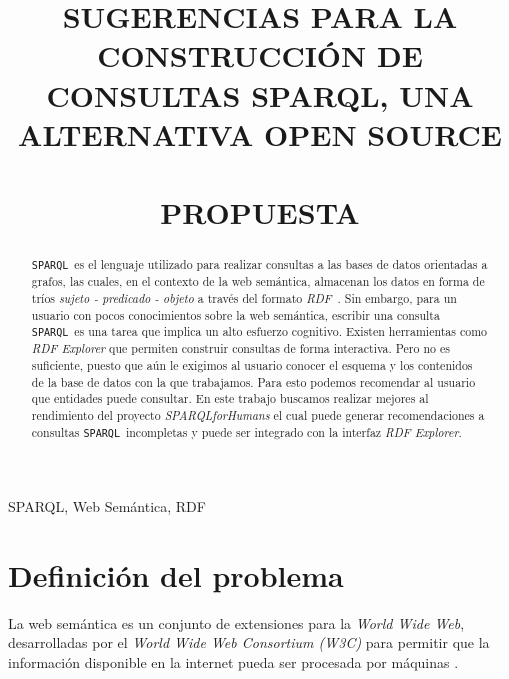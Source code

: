 \documentclass[conference,compsoc]{IEEEtran}
\newcommand{\rdf}{\textit{RDF}\ }
\newcommand{\spql}{\texttt{SPARQL}\ }
\begin{document}
\title{SUGERENCIAS PARA LA CONSTRUCCIÓN DE CONSULTAS SPARQL, UNA ALTERNATIVA OPEN SOURCE\\ \ \\PROPUESTA}

\author{
}

\maketitle

\IEEEpubidadjcol

\begin{abstract}
    \spql es el lenguaje utilizado para realizar consultas a las bases de datos orientadas
    a grafos, las cuales, en el contexto de la web semántica, almacenan los datos en forma
    de tríos \textit{sujeto - predicado - objeto} a través del formato \rdf. Sin embargo,
    para un usuario con pocos conocimientos sobre la web semántica, escribir una consulta
    \spql es una tarea que implica un alto esfuerzo cognitivo. Existen herramientas como
    \textit{RDF Explorer} que permiten construir consultas de forma interactiva. Pero no es
    suficiente, puesto que aún le exigimos al usuario conocer el esquema y los contenidos
    de la base de datos con la que trabajamos. Para esto podemos recomendar al usuario que entidades
    puede consultar. En este trabajo buscamos realizar mejores al rendimiento del proyecto
    \textit{SPARQLforHumans} el cual puede generar recomendaciones a consultas \spql incompletas
    y puede ser integrado con la interfaz \textit{RDF Explorer}.
\end{abstract}

\begin{IEEEkeywords}
    SPARQL, Web Semántica, RDF
\end{IEEEkeywords}

\IEEEpeerreviewmaketitle

\section{Definición del problema}

La web semántica es un conjunto de extensiones para la \textit{World Wide Web},
desarrolladas por el \textit{World Wide Web Consortium (W3C)} para permitir que
la información disponible en la internet pueda ser procesada por máquinas \cite{berners2001semantic}.
\end{document}
